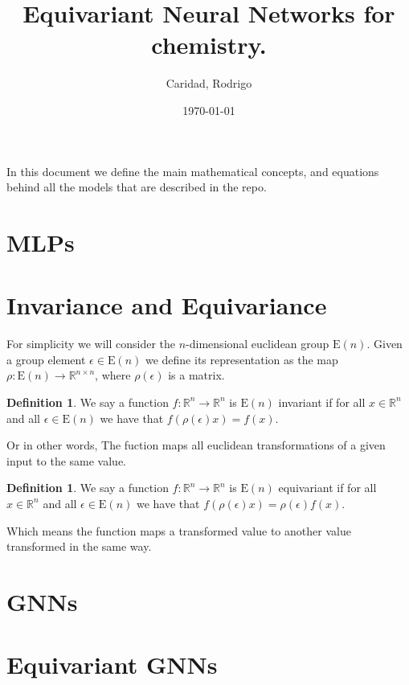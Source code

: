 \documentclass[12pt]{article}
\title{Equivariant Neural Networks for chemistry.}
\author{Caridad, Rodrigo}
\affil{University of Chicago}
\date{\today}
\theoremstyle{definition}
\newtheorem{definition}[theorem]{Definition}
\begin{document}
\maketitle

In this document we define the main mathematical concepts, and equations behind all the models that are described in the repo.

\section{MLPs}

\section{Invariance and Equivariance}

For simplicity we will consider the \(n\)-dimensional euclidean group \(\text{E}(n)\). Given a group element \(\epsilon \in \text{E}(n)\) we define its representation as the map \(\rho : \text{E}(n) \to \mathbb{R} ^ {n \times n}  \), where \(\rho(\epsilon)\) is a matrix.

\begin{definition}
    We say a function \(f : \mathbb{R}^n \to \mathbb{R}^n\) is \(\text{E}(n)\) invariant if for all \(x \in \mathbb{R}^n\) and all \(\epsilon \in \text{E}(n)\) we have that \(f(\rho(\epsilon)x) = f(x)\).
\end{definition}

Or in other words, The fuction maps all euclidean transformations of a given input to the same value.

\begin{definition}
    We say a function \(f : \mathbb{R}^n \to \mathbb{R}^n\) is \(\text{E}(n)\) equivariant if for all \(x \in \mathbb{R}^n\) and all \(\epsilon \in \text{E}(n)\) we have that \(f(\rho(\epsilon)x) = \rho(\epsilon)f(x)\).
\end{definition}

Which means the function maps a transformed value to another value transformed in the same way.

\section{GNNs}

\section{Equivariant GNNs}
\end{document}
